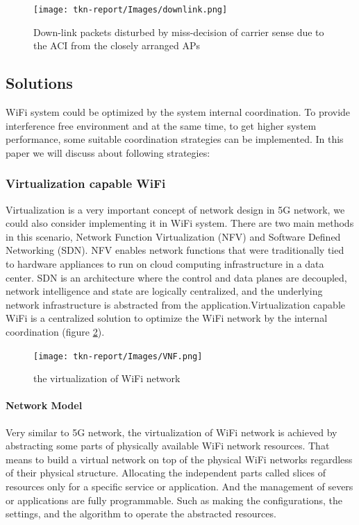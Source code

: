 \documentclass{IEEEtran}
\begin{document}
\graphicspath{{Images/}}
\maketitle
\begin{figure}[htp]
\centering
\texttt{[image: tkn-report/Images/downlink.png]}
\caption{Down-link packets disturbed by miss-decision of carrier sense due to the ACI from the closely arranged APs
}
\label{downlink}
\end{figure}


\subsection{Solutions}
WiFi system could be optimized by the system internal coordination. To provide interference free environment and at the same time, to get higher system performance, some suitable coordination strategies can be implemented. In this paper we will discuss about following strategies:


\subsubsection{Virtualization capable WiFi}
Virtualization is a very important concept of network design in 5G network, we could also consider implementing it in WiFi system. There are two main methods in this scenario, Network Function Virtualization (NFV) and Software Defined Networking (SDN). NFV enables network functions that were traditionally tied to hardware appliances to run on cloud computing infrastructure in a data center. SDN is an architecture where the control and data planes are decoupled, network intelligence and state are logically centralized, and the underlying network infrastructure is abstracted from the application.Virtualization capable WiFi is a centralized solution to optimize the WiFi network by the internal coordination (figure \ref{VNF}).

\graphicspath{{Images/}}
\maketitle
\begin{figure}[htp]
\centering
\texttt{[image: tkn-report/Images/VNF.png]}
\caption{the virtualization of WiFi network}
\label{VNF}
\end{figure}

\paragraph{Network Model}
Very similar to 5G network, the virtualization of WiFi network is achieved by abstracting some parts of physically available WiFi network resources. That means to build a virtual network on top of the physical WiFi networks regardless of their physical structure. Allocating the independent parts called slices of resources only for a specific service or application. And the management of severs or applications are fully programmable. Such as making the configurations, the settings, and the algorithm to operate the abstracted resources.
\end{document}

